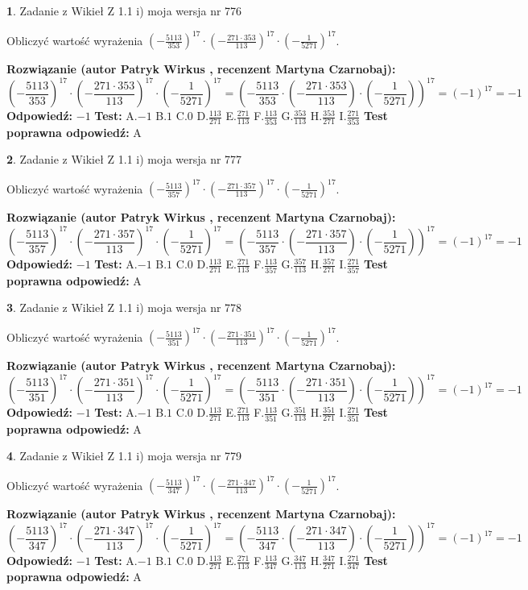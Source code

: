 \documentclass[12pt, a4paper]{article}
\theoremstyle{definition} %
\newtheorem{zad}{}
\newcommand{\zadStart}[1]{\begin{zad}#1\newline}
\newcommand{\zadStop}{\end{zad}}
\newcommand{\rozwStart}[2]{\noindent \textbf{Rozwiązanie (autor #1 , recenzent #2): }\newline}
\newcommand{\rozwStop}{\newline}
\newcommand{\odpStart}{\noindent \textbf{Odpowiedź:}\newline}
\newcommand{\odpStop}{\newline}
\newcommand{\testStart}{\noindent \textbf{Test:}\newline}
\newcommand{\testStop}{\newline}
\newcommand{\kluczStart}{\noindent \textbf{Test poprawna odpowiedź:}\newline}
\newcommand{\kluczStop}{\newline}
\begin{document}
\zadStart{Zadanie z Wikieł Z 1.1 i) moja wersja nr 776}

Obliczyć wartość wyrażenia $(-\frac{5113}{353})^{17} \cdot (-\frac{271 \cdot 353}{113})^{17} \cdot (-\frac{1}{5271})^{17}$.
\zadStop
\rozwStart{Patryk Wirkus}{Martyna Czarnobaj}
$$(-\frac{5113}{353})^{17} \cdot (-\frac{271 \cdot 353}{113})^{17} \cdot (-\frac{1}{5271})^{17} = (-\frac{5113}{353} \cdot (-\frac{271 \cdot 353}{113}) \cdot (-\frac{1}{5271}))^{17} = (-1)^{17} = -1$$
\rozwStop
\odpStart
$-1$
\odpStop
\testStart
A.$-1$ B.$1$ C.$0$ D.$\frac{113}{271}$ E.$\frac{271}{113}$
F.$\frac{113}{353}$ G.$\frac{353}{113}$
H.$\frac{353}{271}$
I.$\frac{271}{353}$
\testStop
\kluczStart
A
\kluczStop



\zadStart{Zadanie z Wikieł Z 1.1 i) moja wersja nr 777}

Obliczyć wartość wyrażenia $(-\frac{5113}{357})^{17} \cdot (-\frac{271 \cdot 357}{113})^{17} \cdot (-\frac{1}{5271})^{17}$.
\zadStop
\rozwStart{Patryk Wirkus}{Martyna Czarnobaj}
$$(-\frac{5113}{357})^{17} \cdot (-\frac{271 \cdot 357}{113})^{17} \cdot (-\frac{1}{5271})^{17} = (-\frac{5113}{357} \cdot (-\frac{271 \cdot 357}{113}) \cdot (-\frac{1}{5271}))^{17} = (-1)^{17} = -1$$
\rozwStop
\odpStart
$-1$
\odpStop
\testStart
A.$-1$ B.$1$ C.$0$ D.$\frac{113}{271}$ E.$\frac{271}{113}$
F.$\frac{113}{357}$ G.$\frac{357}{113}$
H.$\frac{357}{271}$
I.$\frac{271}{357}$
\testStop
\kluczStart
A
\kluczStop



\zadStart{Zadanie z Wikieł Z 1.1 i) moja wersja nr 778}

Obliczyć wartość wyrażenia $(-\frac{5113}{351})^{17} \cdot (-\frac{271 \cdot 351}{113})^{17} \cdot (-\frac{1}{5271})^{17}$.
\zadStop
\rozwStart{Patryk Wirkus}{Martyna Czarnobaj}
$$(-\frac{5113}{351})^{17} \cdot (-\frac{271 \cdot 351}{113})^{17} \cdot (-\frac{1}{5271})^{17} = (-\frac{5113}{351} \cdot (-\frac{271 \cdot 351}{113}) \cdot (-\frac{1}{5271}))^{17} = (-1)^{17} = -1$$
\rozwStop
\odpStart
$-1$
\odpStop
\testStart
A.$-1$ B.$1$ C.$0$ D.$\frac{113}{271}$ E.$\frac{271}{113}$
F.$\frac{113}{351}$ G.$\frac{351}{113}$
H.$\frac{351}{271}$
I.$\frac{271}{351}$
\testStop
\kluczStart
A
\kluczStop



\zadStart{Zadanie z Wikieł Z 1.1 i) moja wersja nr 779}

Obliczyć wartość wyrażenia $(-\frac{5113}{347})^{17} \cdot (-\frac{271 \cdot 347}{113})^{17} \cdot (-\frac{1}{5271})^{17}$.
\zadStop
\rozwStart{Patryk Wirkus}{Martyna Czarnobaj}
$$(-\frac{5113}{347})^{17} \cdot (-\frac{271 \cdot 347}{113})^{17} \cdot (-\frac{1}{5271})^{17} = (-\frac{5113}{347} \cdot (-\frac{271 \cdot 347}{113}) \cdot (-\frac{1}{5271}))^{17} = (-1)^{17} = -1$$
\rozwStop
\odpStart
$-1$
\odpStop
\testStart
A.$-1$ B.$1$ C.$0$ D.$\frac{113}{271}$ E.$\frac{271}{113}$
F.$\frac{113}{347}$ G.$\frac{347}{113}$
H.$\frac{347}{271}$
I.$\frac{271}{347}$
\testStop
\kluczStart
A
\kluczStop
\end{document}
